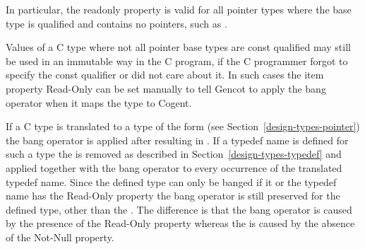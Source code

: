 In particular, the readonly property is valid for all pointer types where the base type is  qualified 
and contains no pointers, such as .

Values of a C type where not all pointer base types are const qualified may still be used in an immutable way in the 
C program, if the C programmer forgot to specify the const qualifier or did not care about it. In such cases the item
property Read-Only can be set manually to tell Gencot to apply the bang operator when it maps the type to Cogent.

If a C type is translated to a type of the form  (see Section~\ref{design-types-pointer}) the bang operator
is applied after  resulting in . If a typedef name is defined for such a type the
 is removed as described in Section~\ref{design-types-typedef} and applied together with the bang operator
to every occurrence of the translated typedef name. Since the defined type can only be banged if it or the typedef name
has the Read-Only property the bang operator is still preserved for the defined type, other than the . 
The difference is that the bang operator is caused by the presence of the Read-Only property whereas the 
is caused by the absence of the Not-Null property.
